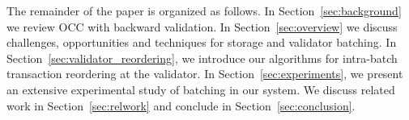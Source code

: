 The remainder of the paper is organized as follows. In Section~\ref{sec:background}  we review OCC with backward validation. In Section~\ref{sec:overview} we discuss challenges, opportunities and techniques for storage and validator batching. In Section~\ref{sec:validator_reordering}, we introduce our algorithms for intra-batch transaction reordering at the validator. In Section~\ref{sec:experiments}, we present an extensive experimental study of batching in our system. We discuss related work in Section~\ref{sec:relwork} and conclude in Section~\ref{sec:conclusion}.

